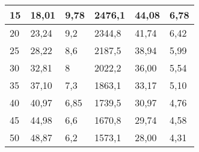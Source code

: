 \begin{table}[H]
\begin{tabular}{|l|l|l|l|l|l|}
    \rowcolor[HTML]{C6E0B4} 
    15                                    & 18,01                                  & 9,78                                               & 2476,1                                   & 44,08                                          & \cellcolor[HTML]{FFC000}6,78                                    \\ \hline
    \rowcolor[HTML]{E2EFDA} 
    20                                    & 23,24                                  & 9,2                                                & 2344,8                                   & 41,74                                          & 6,42                                     \\ \hline
    \rowcolor[HTML]{C6E0B4} 
    25                                    & 28,22                                  & 8,6                                                & 2187,5                                   & 38,94                                          & 5,99                                    \\ \hline
    \rowcolor[HTML]{E2EFDA} 
    30                                    & 32,81                                  & 8                                                  & 2022,2                                   & 36,00                                           & 5,54                                     \\ \hline
    \rowcolor[HTML]{C6E0B4} 
    35                                    & 37,10                                 & 7,3                                                & 1863,1                                   & 33,17                                          & 5,10                                    \\ \hline
    \rowcolor[HTML]{E2EFDA} 
    40                                    & 40,97                                  & 6,85                                               & 1739,5                                   & 30,97                                          & 4,76                                    \\ \hline
    \rowcolor[HTML]{C6E0B4} 
    45                                    & 44,98                                  & 6,6                                                & 1670,8                                   & 29,74                                         & 4,58                                    \\ \hline
    \rowcolor[HTML]{E2EFDA} 
    50                                    & 48,87                                  & 6,2                                                & 1573,1                                   & 28,00                                         & 4,31                                    \\ \hline
    \end{tabular}
    \end{table}
